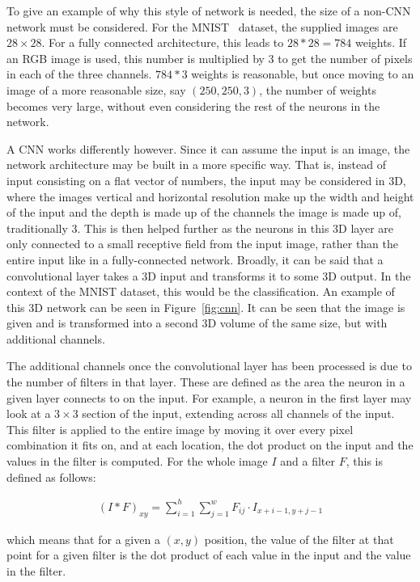 To give an example of why this style of network is needed, the size of a non-CNN
network must be considered. For the MNIST~\cite{lecun2010mnist} dataset, the
supplied images are $28 \times 28$. For a fully connected architecture, this
leads to $28 * 28 = 784$ weights. If an RGB image is used, this number is
multiplied by 3 to get the number of pixels in each of the three channels. $784
* 3$ weights is reasonable, but once moving to an image of a more reasonable
size, say $(250, 250, 3)$, the number of weights becomes very large, without
even considering the rest of the neurons in the network.

A CNN works differently however. Since it can assume the input is an
image, the network architecture may be built in a more specific way. That is,
instead of input consisting on a flat vector of numbers, the input may be
considered in 3D, where the images vertical and horizontal resolution make up
the width and height of the input and the depth is made up of the channels the
image is made up of, traditionally 3. This is then helped further as the
neurons in this 3D layer are only connected to a small receptive field from the
input image, rather than the entire input like in a fully-connected network.
Broadly, it can be said that a convolutional layer takes a 3D input and
transforms it to some 3D output. In the context of the MNIST dataset, this
would be the classification. An example of this 3D network can be seen in
Figure~\ref{fig:cnn}. It can be seen that the image is given and is transformed
into a second 3D volume of the same size, but with additional channels.

The additional channels once the convolutional layer has been processed is due
to the number of filters in that layer. These are defined as the area the
neuron in a given layer connects to on the input. For example, a neuron in the
first layer may look at a $3 \times 3$ section of the input, extending across
all channels of the input. This filter is applied to the entire image by moving
it over every pixel combination it fits on, and at each location, the dot product
on the input and the values in the filter is computed. For the whole image $I$
and a filter $F$, this is defined as follows:

\begin{align}
    {(I*F)}_{xy} = \sum^{h}_{i=1} \sum^{w}_{j=1} F_{ij} \cdot I_{x+i-1, y+j-1}
\end{align}

which means that for a given a $(x,y)$ position, the value of the filter at that
point for a given filter is the dot product of each value in the input and the
value in the filter.

